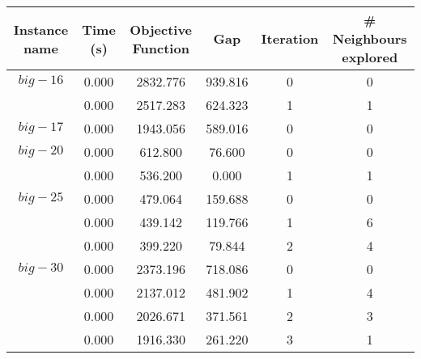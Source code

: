 \begin{table}[H]
    \centering
    \noindent
    \begin{tabular}{cccccc}
        \toprule
        Instance name & Time (s) & Objective Function & Gap & Iteration &
        \# Neighbours explored \\
        
        \midrule
        
        $big-16$    & 0.000    & 2832.776   & 939.816 & 0     & 0     \\
                    & 0.000    & 2517.283   & 624.323 & 1     & 1     \\
        
        \midrule
        
        $big-17$    & 0.000    & 1943.056   & 589.016 & 0     & 0     \\
        
        \midrule
        
        $big-20$    & 0.000    &  612.800   &  76.600 & 0     &  0     \\
                    & 0.000    &  536.200   &   0.000 & 1     &  1     \\
        
        \midrule
        
        $big-25$    & 0.000    &  479.064   & 159.688 & 0     &  0     \\
                    & 0.000    &  439.142   & 119.766 & 1     &  6     \\
                    & 0.000    &  399.220   &  79.844 & 2     &  4     \\
        
        \midrule
        
        $big-30$    & 0.000    & 2373.196   & 718.086 & 0     &  0     \\
                    & 0.000    & 2137.012   & 481.902 & 1     &  4     \\
                    & 0.000    & 2026.671   & 371.561 & 2     &  3     \\
                    & 0.000    & 1916.330   & 261.220 & 3     &  1     \\
        
        \bottomrule
    \end{tabular}
    \label{table:local-search:traces}
\end{table}

